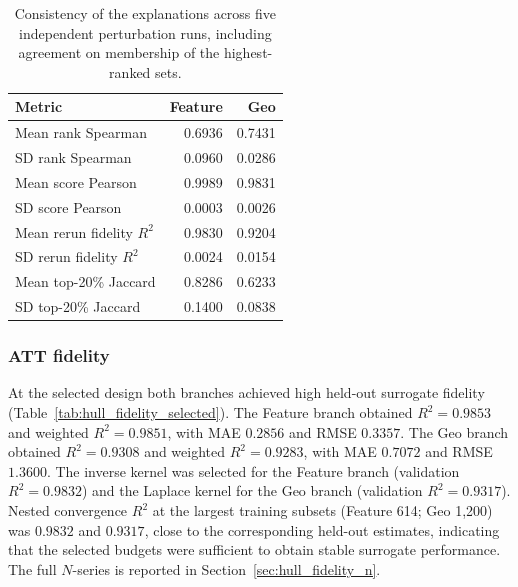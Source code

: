 \begin{table}[H]
\centering
\caption{Consistency of the explanations across five independent perturbation runs, including agreement on membership of the highest-ranked sets.}
\label{tab:hull_consistency}
\small
\begin{tabularx}{\textwidth}{X r r}
\toprule
Metric & Feature & Geo \\
\midrule
Mean rank Spearman & 0.6936 & 0.7431 \\
SD rank Spearman & 0.0960 & 0.0286 \\
Mean score Pearson & 0.9989 & 0.9831 \\
SD score Pearson & 0.0003 & 0.0026 \\
Mean rerun fidelity $R^2$ & 0.9830 & 0.9204 \\
SD rerun fidelity $R^2$ & 0.0024 & 0.0154 \\
Mean top-20\% Jaccard & 0.8286 & 0.6233 \\
SD top-20\% Jaccard & 0.1400 & 0.0838 \\
\bottomrule
\end{tabularx}
\end{table}

\subsubsection{ATT fidelity}
\label{sec:hull_att_fidelity}

At the selected design both branches achieved high held-out surrogate fidelity (Table~\ref{tab:hull_fidelity_selected}). The Feature branch obtained $R^2=0.9853$ and weighted $R^2=0.9851$, with MAE $0.2856$ and RMSE $0.3357$. The Geo branch obtained $R^2=0.9308$ and weighted $R^2=0.9283$, with MAE $0.7072$ and RMSE $1.3600$. The inverse kernel was selected for the Feature branch (validation $R^2=0.9832$) and the Laplace kernel for the Geo branch (validation $R^2=0.9317$). Nested convergence $R^2$ at the largest training subsets (Feature 614; Geo 1,200) was $0.9832$ and $0.9317$, close to the corresponding held-out estimates, indicating that the selected budgets were sufficient to obtain stable surrogate performance. The full $N$-series is reported in Section~\ref{sec:hull_fidelity_n}.

